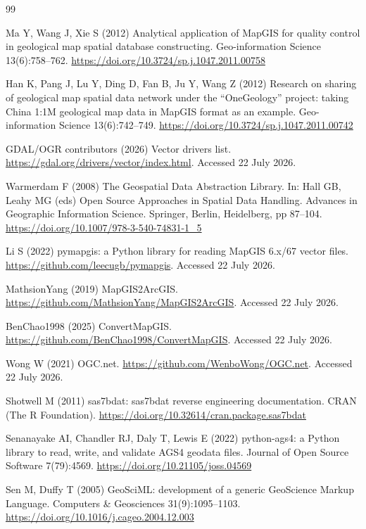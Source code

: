 \documentclass[preprint,12pt,numbers]{elsarticle}
\begin{document}
\begin{thebibliography}{99}

Ma Y, Wang J, Xie S (2012) Analytical application of MapGIS for quality control in geological map spatial database constructing. Geo-information Science 13(6):758--762. \url{https://doi.org/10.3724/sp.j.1047.2011.00758}

Han K, Pang J, Lu Y, Ding D, Fan B, Ju Y, Wang Z (2012) Research on sharing of geological map spatial data network under the ``OneGeology'' project: taking China 1:1M geological map data in MapGIS format as an example. Geo-information Science 13(6):742--749. \url{https://doi.org/10.3724/sp.j.1047.2011.00742}

GDAL/OGR contributors (2026) Vector drivers list. \url{https://gdal.org/drivers/vector/index.html}. Accessed 22 July 2026.

Warmerdam F (2008) The Geospatial Data Abstraction Library. In: Hall GB, Leahy MG (eds) Open Source Approaches in Spatial Data Handling. Advances in Geographic Information Science. Springer, Berlin, Heidelberg, pp 87--104. \url{https://doi.org/10.1007/978-3-540-74831-1_5}

Li S (2022) pymapgis: a Python library for reading MapGIS 6.x/67 vector files. \url{https://github.com/leecugb/pymapgis}. Accessed 22 July 2026.

MathsionYang (2019) MapGIS2ArcGIS. \url{https://github.com/MathsionYang/MapGIS2ArcGIS}. Accessed 22 July 2026.

BenChao1998 (2025) ConvertMapGIS. \url{https://github.com/BenChao1998/ConvertMapGIS}. Accessed 22 July 2026.

Wong W (2021) OGC.net. \url{https://github.com/WenboWong/OGC.net}. Accessed 22 July 2026.

Shotwell M (2011) sas7bdat: sas7bdat reverse engineering documentation. CRAN (The R Foundation). \url{https://doi.org/10.32614/cran.package.sas7bdat}

Senanayake AI, Chandler RJ, Daly T, Lewis E (2022) python-ags4: a Python library to read, write, and validate AGS4 geodata files. Journal of Open Source Software 7(79):4569. \url{https://doi.org/10.21105/joss.04569}

Sen M, Duffy T (2005) GeoSciML: development of a generic GeoScience Markup Language. Computers \& Geosciences 31(9):1095--1103. \url{https://doi.org/10.1016/j.cageo.2004.12.003}


\end{thebibliography}
\end{document}
